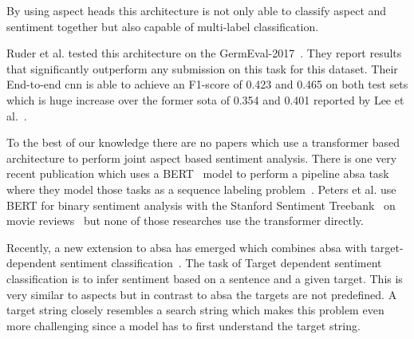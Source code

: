 By using aspect heads this architecture is not only able to classify aspect and sentiment together but also capable of multi-label classification.

Ruder et al. tested this architecture on the GermEval-2017~\cite{Wojatzki2017}. They report results that significantly outperform any submission on this task for this dataset. Their End-to-end \gls{cnn} is able to achieve an F1-score of 0.423 and 0.465 on both test sets which is huge increase over the former \acrfull{sota} of 0.354 and 0.401 reported by Lee et al.~\cite{Lee2017}.
\medskip

To the best of our knowledge there are no papers which use a transformer based architecture to perform joint aspect based sentiment analysis. There is one very recent publication which uses a BERT~\cite{Devlin2018} model to perform a pipeline \gls{absa} task where they model those tasks as a sequence labeling problem~\cite{Xu2019}. Peters et al. use BERT for binary sentiment analysis with the Stanford Sentiment Treebank~\cite{Socher2013} on movie reviews~\cite{Peters2019} but none of those researches use the transformer directly.
\medskip

Recently, a new extension to \gls{absa} has emerged which combines \gls{absa} with target-dependent sentiment classification~\cite{Tang2016}. The task of Target dependent sentiment classification is to infer sentiment based on a sentence and a given target. This is very similar to aspects but in contrast to \gls{absa} the targets are not predefined. A target string closely resembles a search string which makes this problem even more challenging since a model has to first understand the target string.